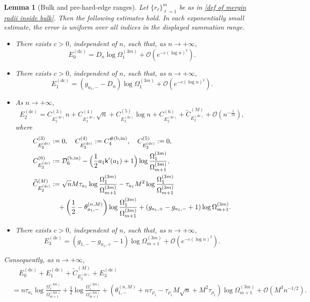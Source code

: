 \documentclass[a4paper]{article}
\newtheorem{lemma}[theorem]{Lemma}
\numberwithin{equation}{section}
\begin{document}
\begin{lemma}[Bulk and pre-hard-edge ranges]
\label{lemma:bulk case asymptotic expansion}
Let $\{r_{\ell}\}_{\ell=1}^m$ be as in
\eqref{def of mergin radii inside bulk}.  Then the following estimates hold.
In each exponentially small estimate, the error is uniform over all indices
in the displayed summation range.
\begin{itemize}
    \item There exists $c>0$, independent of $n$, such that, as
    $n\to+\infty$,
\[
E_0^{(\mathrm{dc})}
=D_n\log\Omega_1^{(3m)}+\mathcal{O}(e^{-c(\log n)^2}). 
\]
    \item 
    There exists $c>0$, independent of $n$, such that, as
    $n\to+\infty$,
    \begin{equation}
E_1^{(\mathrm{dc})}
=(g_{a_1,-}-D_n)\log\Omega_1^{(3m)}+\mathcal{O}(e^{-c(\log n)^2}). 
    \end{equation}
    \item As $n\to+\infty$,
\[
 E_2^{(\mathrm{dc})} 
 =
 C_{E_2^{(\mathrm{dc})} }^{(3)}n 
 + C_{E_2^{(\mathrm{dc})}}^{(4)} \sqrt{n} 
 + C_{E_2^{(\mathrm{dc})} }^{(5)}\log n
 + C_{E_2^{(\mathrm{dc})}}^{(6)} 
 + \widetilde{C}_{E_2^{(\mathrm{dc})} }^{(M)} 
 + \mathcal{O}(n^{-\frac{1}{12}}), 
\]
where   
\begin{align*}
C_{E_2^{(\mathrm{dc})}}^{(3)}
&:=0, 
\quad
C_{E_2^{(\mathrm{dc})}}^{(4)}
:=C_4^{\#(\mathrm{b,in})},
\quad
C_{E_2^{(\mathrm{dc})}}^{(5)}:=0,
\\
C_{E_2^{(\mathrm{dc})}}^{(6)}
&:=
\mathcal{D}_6^{(\mathrm{b},\mathrm{in})}
-
\Bigl( 
\frac{1}{2}a_1\mathsf{k}'(a_1)+1
\Bigr)
\log\frac{\Omega_{1}^{(3m)}}{\Omega_{m+1}^{(3m)}}, 
\\
\widetilde{C}_{E_2^{(\mathrm{dc})}}^{(M)} 
&:=
\sqrt{n}M\tau_{a_1}\log\frac{\Omega_{1}^{(3m)}}{\Omega_{m+1}^{(3m)}}
-
\tau_{a_1}M^2
\log\frac{\Omega_{1}^{(3m)}}{\Omega_{m+1}^{(3m)}}
\\
&\quad
+ \bigg( \frac{1}{2}-\theta_{a_1,-}^{(n,M)} \bigg)\log\frac{\Omega_{1}^{(3m)}}{\Omega_{m+1}^{(3m)}}
+
(g_{a_1,+}-g_{a_1,-}+1)\log \Omega_{m+1}^{(3m)}.
\end{align*}  
    \item 
    There exists $c>0$, independent of $n$, such that, as
    $n\to+\infty$,
    \begin{equation}
E_3^{(\mathrm{dc})}
=(g_{1,-}-g_{a_{1},+}-1)\log\Omega_{m+1}^{(3m)}+\mathcal{O}(e^{-c(\log n)^2}). 
    \end{equation}
\end{itemize}
Consequently, as $n\to+\infty$,
\begin{align*}
&\quad E_0^{(\mathrm{dc})}
+
E_1^{(\mathrm{dc})}
+
\widetilde{C}_{E_2^{(\mathrm{dc})}}^{(M)}
+
E_3^{(\mathrm{dc})}
\\
&=
n\tau_{a_1}\log\frac{\Omega_1^{(3m)}}{\Omega_{m+1}^{(3m)}}
+ \frac{1}{2}\log\frac{\Omega_{1}^{(3m)}}{\Omega_{m+1}^{(3m)}}
+(\theta_{1,-}^{(n,M)}+n\tau_{\rho_1}-\tau_{\rho_1}M\sqrt{n}+M^2\tau_{\rho_1})\log\Omega_{m+1}^{(3m)}
+\mathcal{O}(M^3n^{-1/2}).
\end{align*}
\end{lemma}
\end{document}
